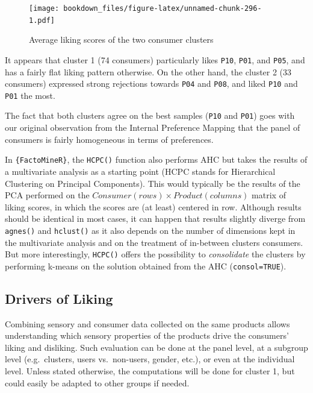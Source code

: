 \documentclass[
]{krantz}
\renewenvironment{quote}{\begin{VF}}{\end{VF}}
\begin{document}
\begin{figure}
\centering
\texttt{[image: bookdown\_files/figure-latex/unnamed-chunk-296-1.pdf]}
\caption{\label{fig:unnamed-chunk-296}Average liking scores of the two consumer clusters}
\end{figure}

It appears that cluster 1 (74 consumers) particularly likes \texttt{P10}, \texttt{P01}, and \texttt{P05}, and has a fairly flat liking pattern otherwise. On the other hand, the cluster 2 (33 consumers) expressed strong rejections towards \texttt{P04} and \texttt{P08}, and liked \texttt{P10} and \texttt{P01} the most.

The fact that both clusters agree on the best samples (\texttt{P10} and \texttt{P01}) goes with our original observation from the Internal Preference Mapping that the panel of consumers is fairly homogeneous in terms of preferences.

\begin{quote}
In \texttt{\{FactoMineR\}}, the \texttt{HCPC()} function also performs AHC but takes the results of a multivariate analysis as a starting point (HCPC stands for Hierarchical Clustering on Principal Components). This would typically be the results of the PCA performed on the \(Consumer (rows)\times{Product (columns)}\) matrix of liking scores, in which the scores are (at least) centered in row.
Although results should be identical in most cases, it can happen that results slightly diverge from \texttt{agnes()} and \texttt{hclust()} as it also depends on the number of dimensions kept in the multivariate analysis and on the treatment of in-between clusters consumers. But more interestingly, \texttt{HCPC()} offers the possibility to \emph{consolidate} the clusters by performing k-means on the solution obtained from the AHC (\texttt{consol=TRUE}).
\end{quote}

\hypertarget{drivers-of-liking}{%
\subsection{Drivers of Liking}\label{drivers-of-liking}}

Combining sensory and consumer data collected on the same products allows understanding which sensory properties of the products drive the consumers' liking and disliking. Such evaluation can be done at the panel level, at a subgroup level (e.g.~clusters, users vs.~non-users, gender, etc.), or even at the individual level. Unless stated otherwise, the computations will be done for cluster 1, but could easily be adapted to other groups if needed.
\end{document}
